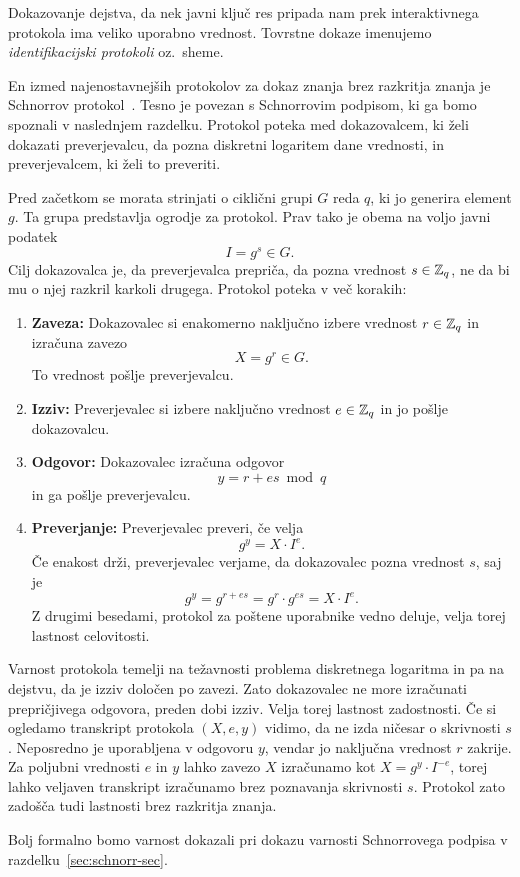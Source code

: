 Dokazovanje dejstva, da nek javni ključ res pripada nam prek interaktivnega protokola ima veliko
uporabno vrednost. Tovrstne dokaze imenujemo \textit{identifikacijski protokoli} oz.\ sheme.

\begin{primer}
    En izmed najenostavnejših protokolov za dokaz znanja brez razkritja znanja je Schnorrov
    protokol~\cite{schnorr1989sig}. Tesno je povezan s Schnorrovim podpisom, ki ga bomo spoznali v
    naslednjem razdelku. Protokol poteka med dokazovalcem, ki želi dokazati preverjevalcu, da
    pozna diskretni logaritem dane vrednosti, in preverjevalcem, ki želi to preveriti.

    Pred začetkom se morata strinjati o ciklični grupi $G$ reda $q$, ki jo generira element $g$. Ta
    grupa predstavlja ogrodje za protokol. Prav tako je obema na voljo javni podatek
    $$
    I = g^s \in G.
    $$
    Cilj dokazovalca je, da preverjevalca prepriča, da pozna vrednost $s \in \mathbb Z_q$, ne da bi mu
    o njej razkril karkoli drugega. Protokol poteka v več korakih:
    \begin{enumerate}
        \item \textbf{Zaveza:}
            Dokazovalec si enakomerno naključno izbere vrednost $r \in \mathbb Z_q$ in izračuna zavezo
            $$
            X = g^r \in G.
            $$
            To vrednost pošlje preverjevalcu.
        \item \textbf{Izziv:}
            Preverjevalec si izbere naključno vrednost $e \in \mathbb Z_q$ in jo pošlje dokazovalcu.
        \item \textbf{Odgovor:}
            Dokazovalec izračuna odgovor
            $$
            y = r + es \bmod q
            $$
            in ga pošlje preverjevalcu.
        \item \textbf{Preverjanje:}
            Preverjevalec preveri, če velja
            $$
            g^y = X \cdot I^e.
            $$
            Če enakost drži, preverjevalec verjame, da dokazovalec pozna vrednost $s$, saj je
            $$
            g^y = g^{r + es} = g^r \cdot g^{es} = X \cdot I^e.
            $$
            Z drugimi besedami, protokol za poštene uporabnike vedno deluje, velja torej lastnost
            celovitosti.
    \end{enumerate}
    Varnost protokola temelji na težavnosti problema diskretnega logaritma in pa na dejstvu, da je
    izziv določen po zavezi. Zato dokazovalec ne more izračunati prepričjivega odgovora, preden
    dobi izziv. Velja torej lastnost zadostnosti. Če si ogledamo transkript protokola $(X, e, y)$
    vidimo, da ne izda ničesar o skrivnosti $s$. Neposredno je uporabljena v odgovoru $y$, vendar jo
    naključna vrednost $r$ zakrije. Za poljubni vrednosti $e$ in $y$ lahko zavezo $X$ izračunamo kot
    $X = g^y \cdot I^{-e}$, torej lahko veljaven transkript izračunamo brez poznavanja skrivnosti $s$.
    Protokol zato zadošča tudi lastnosti brez razkritja znanja.

    Bolj formalno bomo varnost dokazali pri dokazu varnosti Schnorrovega podpisa v
    razdelku~\ref{sec:schnorr-sec}.
\end{primer}

